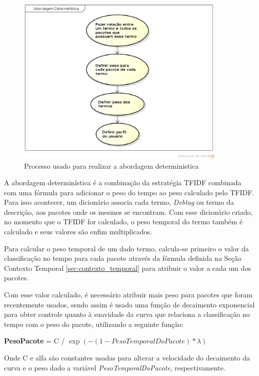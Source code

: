 \begin{figure}[h]
  \centering
  \includegraphics[width=0.9\textwidth]{figuras/abordagem_deterministica.eps}
  \caption{Processo usado para realizar a abordagem deterministica}
  \label{fig:abordagem_deterministica}
\end{figure}

A abordagem determinística é a combinação da estratégia TFIDF combinada com
uma fórmula para adicionar o peso do tempo ao peso calculado pelo TFIDF. Para
isso acontecer, um dicionário associa cada termo, \textit{Debtag} ou termo da
descrição, aos pacotes onde os mesmos se encontram. Com esse dicionário criado,
no momento que o TFIDF for calculado, o peso temporal do termo também é
calculado e seus valores são enfim multiplicados.

Para calcular o peso temporal de um dado termo, calcula-se primeiro o valor da
classificação no tempo para cada pacote através da fórmula definida na Seção
Contexto Temporal \ref{sec:contexto_temporal} para atribuir o valor
a cada um dos pacotes.

Com esse valor calculado, é necessário atribuir mais peso para pacotes que
foram recentemente usados, sendo assim é usado uma função de decaimento
exponencial para obter controle quanto à suavidade da curva que relaciona
a classificação no tempo com o peso do pacote, utilizando a seguinte função:

\textbf{PesoPacote} = C / $\exp\left(-({1 - PesoTemporalDoPacote}) * {\lambda}\right)$

Onde C e alfa são constantes usadas para alterar a velocidade do decaimento da
curva e o peso dado a variável \textit{PesoTemporalDoPacote}, respectivamente.

